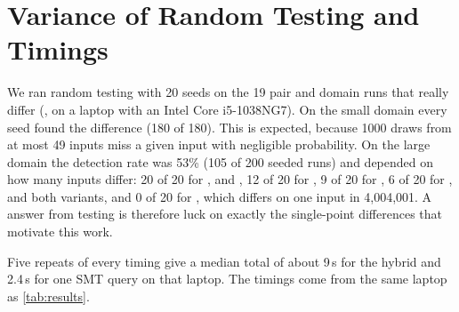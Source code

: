 \section{Variance of Random Testing and Timings}
\label{app:variance}

We ran random testing with 20 seeds on the 19 pair and domain runs that really differ
(, on a laptop with an Intel Core i5-1038NG7). On the small
domain every seed found the difference (180 of 180). This is expected, because 1000 draws from at most 49 inputs miss a given input
with negligible probability. On the large domain the detection rate was 53\% (105 of 200 seeded runs) and depended on how many
inputs differ: 20 of 20 for ,  and
, 12 of 20 for , 9 of 20 for , 6 of
20 for ,  and both  variants, and 0 of 20
for , which differs on one input in 4,004,001. A \chg{} answer from testing is
therefore luck on exactly the single-point differences that motivate this work.

Five repeats of every timing give a median total of about 9\,s for the hybrid and 2.4\,s for
one SMT query on that laptop. The timings come from the same laptop as
\cref{tab:results}.
